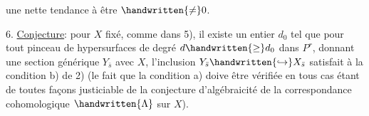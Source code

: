 une nette tendance à être $\handwritten{\ne}0$.

6.\quad {} \uline{Conjecture}: pour $X$ fixé, comme dans 5),  il existe un entier $d_0$ tel que pour tout pinceau  de hypersurfaces de degré $d\handwritten{\geq}d_0$ dans $P^r$, donnant une section générique $Y_{\bar s}$ avec $X$, l'inclusion $Y_{\bar s}\handwritten{\hookrightarrow}X_{\bar s}$ satisfait à la condition b) de 2) (le fait que la condition a) doive être vérifiée en tous cas étant de toutes façons justiciable de la conjecture d'algébraicité de la correspondance cohomologique $\handwritten{\Lambda}$ sur $X$).

